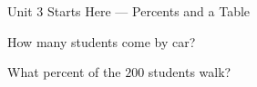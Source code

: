 \documentclass[12pt]{article}
\begin{document}
\begin{notesbox}{Unit 3 Starts Here --- Percents and a Table}
\begin{enumerate}[leftmargin=1.8em, itemsep=22pt, topsep=10pt]
        \vspace{10pt}
        How many students come by car? \blank{2.6cm}

        \vspace{12pt}
        What percent of the $200$ students walk? \blank{2.6cm}

\end{enumerate}
\end{notesbox}
\end{document}
